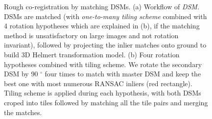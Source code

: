 \begin{figure}[htbp]
    \begin{center}
        \caption{Rough co-registration by matching DSMs. (a) Workflow of \textit{DSM}. DSMs are matched (with \textit{one-to-many tiling scheme} combined with 4 rotation hypotheses which are explained in (b), if the matching method is unsatisfactory on large images and not rotation invariant), followed by projecting the inlier matches onto ground to build 3D Helmert transformation model. (b) Four rotation hypotheses combined with tiling scheme. We rotate the secondary DSM by 90 $^\circ$ four times to match with master DSM and keep the best one with most numerous RANSAC inliers (red rectangle). Tiling scheme is applied during each hypothesis, with both DSMs croped into tiles followed by matching all the tile pairs and merging the matches.}
        \label{WorkflowDSM}
    \end{center}
\end{figure}

